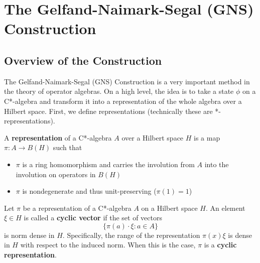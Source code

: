 \section{The Gelfand-Naimark-Segal (GNS) Construction}
\subsection{Overview of the Construction}
The Gelfand-Naimark-Segal (GNS) Construction is a very important method in the
theory of operator algebras. On a high level, the idea is to 
take a state $\phi$ on a C*-algebra and transform it into a representation of the whole
algebra over a Hilbert space. First, we define representations (technically these
are *-representations).
\begin{definition}
    A \textbf{representation} of a C*-algebra $A$ over a Hilbert space $H$ is a map
    $\pi: A \to B(H)$ such that
    \begin{itemize}
        \item $\pi$ is a ring homomorphism and carries the involution from $A$
        into the involution on operators in $B(H)$
        \item $\pi$ is nondegenerate and thus unit-preserving ($\pi(1) = 1$)
    \end{itemize}
\end{definition}

\begin{definition}
    Let $\pi$ be a representation of a C*-algebra $A$ on a Hilbert space $H$. An
    element $\xi \in H$ is called a \textbf{cyclic vector} if the set of vectors
    \begin{equation}
        \{ \pi(a) \cdot \xi : a \in A \}
    \end{equation}
    is norm dense in $H$. Specifically, the range of the representation $\pi(x) \xi$
    is dense in $H$ with respect to the induced norm. When this is the case, $\pi$
    is a \textbf{cyclic representation}.
\end{definition}



